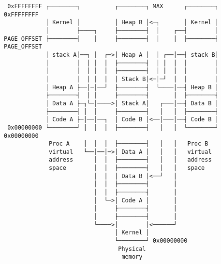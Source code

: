 \documentclass[varwidth=51em,crop]{standalone}
\begin{document}
\begin{verbatim}
 0xFFFFFFFF ┌────────┐          ┌────────┐ MAX      ┌────────┐ 0xFFFFFFFF
            │ Kernel │          │ Heap B │<─┐       │ Kernel │
            │        ├────┐     ├────────┤  │    ┌──┤        │
PAGE_OFFSET ├────────┤    │     ├────────┤  │    │  ├────────┤ PAGE_OFFSET
            │ stack A│──┐ │  ┌─>│ Heap A │  │ ┌──│──┤ stack B│
            │        │  │ │  │  ├────────┤  │ │  │  │        │
            │        │  │ │  │  ├────────┤  │ │  │  │        │
            │        │  │ │  │  │ Stack B│<─│─┘  │  │        │
            │ Heap A ├──│─│──┘  ├────────┤  └────│──┤ Heap B │
            ├────────┤  │ │     ├────────┤       │  ├────────┤
            │ Data A ├─┐└─│────>│ Stack A│   ┌───│──┤ Data B │
            ├────────┤ │  │     ├────────┤   │   │  ├────────┤
            │ Code A ├─│──│──┐  │ Code B │<──│───│──┤ Code B │
 0x00000000 └────────┘ │  │  │  ├────────┤   │   │  └────────┘ 0x00000000
             Proc A    │  │  │  ├────────┤   │   │   Proc B
             virtual   └──│──│─>│ Data A │   │   │   virtual
             address      │  │  ├────────┤   │   │   address
             space        │  │  ├────────┤   │   │   space
                          │  │  │ Data B │<──┘   │
                          │  │  ├────────┤       │
                          │  │  ├────────┤       │
                          │  └─>│ Code A │       │
                          │     ├────────┤       │
                          │     ├────────┤       │
                          └────>│        │<──────┘
                                │ Kernel │
                                └────────┘ 0x00000000
                                 Physical
                                  memory
\end{verbatim}
\end{document}
